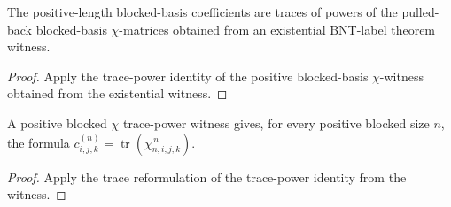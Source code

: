 \begin{theorem}%
    \label{thm:mpdo_bnt_label_theorem_witness_blocked_coeff_eq_positive_blocked_chi_trace_pow}
    \leanok
    The positive-length blocked-basis coefficients are traces of powers of the
    pulled-back blocked-basis $\chi$-matrices obtained from an existential
    BNT-label theorem witness.
\end{theorem}
\begin{proof}\leanok
    Apply the trace-power identity of the positive blocked-basis
    $\chi$-witness obtained from the existential witness.
\end{proof}

\begin{theorem}%
    \label{thm:mpdo_positive_blocked_structure_chi_eq_trace_matrix_pow}
    \leanok
    A positive blocked $\chi$ trace-power witness gives, for every positive
    blocked size $n$, the formula
    $c^{(n)}_{i,j,k}=\operatorname{tr}(\chi_{n,i,j,k}^{\,n})$.
\end{theorem}
\begin{proof}\leanok
    Apply the trace reformulation of the trace-power identity from the witness.
\end{proof}
